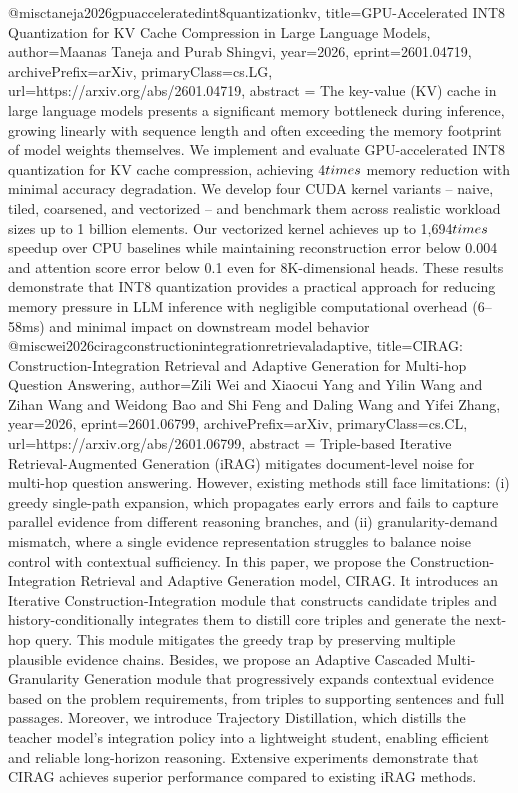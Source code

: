 {}@misc{taneja2026gpuacceleratedint8quantizationkv,
      title={GPU-Accelerated INT8 Quantization for KV Cache Compression in Large Language Models}, 
      author={Maanas Taneja and Purab Shingvi},
      year={2026},
      eprint={2601.04719},
      archivePrefix={arXiv},
      primaryClass={cs.LG},
      url={https://arxiv.org/abs/2601.04719},
      abstract = {The key-value (KV) cache in large language models presents a significant memory bottleneck during inference, growing linearly with sequence length and often exceeding the memory footprint of model weights themselves. We implement and evaluate GPU-accelerated INT8 quantization for KV cache compression, achieving 4$\\times$ memory reduction with minimal accuracy degradation. We develop four CUDA kernel variants -- naive, tiled, coarsened, and vectorized -- and benchmark them across realistic workload sizes up to 1 billion elements. Our vectorized kernel achieves up to 1,694$\\times$ speedup over CPU baselines while maintaining reconstruction error below 0.004 and attention score error below 0.1 even for 8K-dimensional heads. These results demonstrate that INT8 quantization provides a practical approach for reducing memory pressure in LLM inference with negligible computational overhead (6--58ms) and minimal impact on downstream model behavior}
}@misc{wei2026ciragconstructionintegrationretrievaladaptive,
      title={CIRAG: Construction-Integration Retrieval and Adaptive Generation for Multi-hop Question Answering}, 
      author={Zili Wei and Xiaocui Yang and Yilin Wang and Zihan Wang and Weidong Bao and Shi Feng and Daling Wang and Yifei Zhang},
      year={2026},
      eprint={2601.06799},
      archivePrefix={arXiv},
      primaryClass={cs.CL},
      url={https://arxiv.org/abs/2601.06799},
      abstract = {Triple-based Iterative Retrieval-Augmented Generation (iRAG) mitigates document-level noise for multi-hop question answering. However, existing methods still face limitations: (i) greedy single-path expansion, which propagates early errors and fails to capture parallel evidence from different reasoning branches, and (ii) granularity-demand mismatch, where a single evidence representation struggles to balance noise control with contextual sufficiency. In this paper, we propose the Construction-Integration Retrieval and Adaptive Generation model, CIRAG. It introduces an Iterative Construction-Integration module that constructs candidate triples and history-conditionally integrates them to distill core triples and generate the next-hop query. This module mitigates the greedy trap by preserving multiple plausible evidence chains. Besides, we propose an Adaptive Cascaded Multi-Granularity Generation module that progressively expands contextual evidence based on the problem requirements, from triples to supporting sentences and full passages. Moreover, we introduce Trajectory Distillation, which distills the teacher model's integration policy into a lightweight student, enabling efficient and reliable long-horizon reasoning. Extensive experiments demonstrate that CIRAG achieves superior performance compared to existing iRAG methods.}
}
